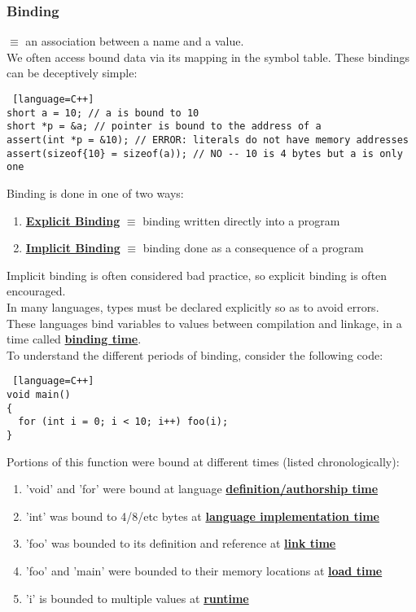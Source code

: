 \documentclass[../../lecture_notes.tex]{subfiles}
\begin{document}
\subsubsection*{Binding}
$\equiv$ an association between a name and a value.\\
We often access bound data via its mapping in the symbol table.  These bindings can be deceptively simple:
\begin{lstlisting} [language=C++]
short a = 10; // a is bound to 10
short *p = &a; // pointer is bound to the address of a
assert(int *p = &10); // ERROR: literals do not have memory addresses
assert(sizeof{10} = sizeof(a)); // NO -- 10 is 4 bytes but a is only one
\end{lstlisting}
Binding is done in one of two ways:
\begin{enumerate} [itemsep=0mm]
	\item \textbf{\underline{Explicit Binding}} $\equiv$ binding written directly into a program
	\item \textbf{\underline{Implicit Binding}} $\equiv$ binding done as a consequence of a program
\end{enumerate}
Implicit binding is often considered bad practice, so explicit binding is often encouraged.\\
In many languages, types must be declared explicitly so as to avoid errors.\\
These languages bind variables to values between compilation and linkage, 
	in a time called \textbf{\underline{binding time}}.\\
To understand the different periods of binding, consider the following code:
\begin{lstlisting} [language=C++]
void main() 
{
  for (int i = 0; i < 10; i++) foo(i);
}
\end{lstlisting}
Portions of this function were bound at different times (listed chronologically):
\begin{enumerate} [itemsep=0mm]
	\item 'void' and 'for' were bound at language \textbf{\underline{definition/authorship time}}
	\item 'int' was bound to 4/8/etc bytes at \textbf{\underline{language implementation time}}
	\item 'foo' was bounded to its definition and reference at \textbf{\underline{link time}}
	\item 'foo' and 'main' were bounded to their memory locations at \textbf{\underline{load time}}
	\item 'i' is bounded to multiple values at \textbf{\underline{runtime}}
\end{enumerate}
\end{document}
